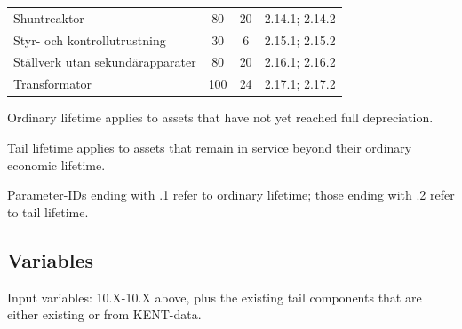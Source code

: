 \begin{table}[H]
\begin{threeparttable}
\begin{tabular}{@{}p{7cm}ccl@{}}
Shuntreaktor & 80 & 20 & 2.14.1; 2.14.2 \\
Styr- och kontrollutrustning & 30 & 6 & 2.15.1; 2.15.2 \\
Ställverk utan sekundärapparater & 80 & 20 & 2.16.1; 2.16.2 \\
Transformator & 100 & 24 & 2.17.1; 2.17.2 \\
\bottomrule
\end{tabular}
\begin{tablenotes}
\item[a] Ordinary lifetime applies to assets that have not yet reached full depreciation.
\item[b] Tail lifetime applies to assets that remain in service beyond their ordinary economic lifetime.
\item Parameter-IDs ending with .1 refer to ordinary lifetime; those ending with .2 refer to tail lifetime.
\end{tablenotes}
\end{threeparttable}
\end{table}

\subsection{Variables}

Input variables: 10.X-10.X above, plus the existing tail components that are either existing or from KENT-data.

